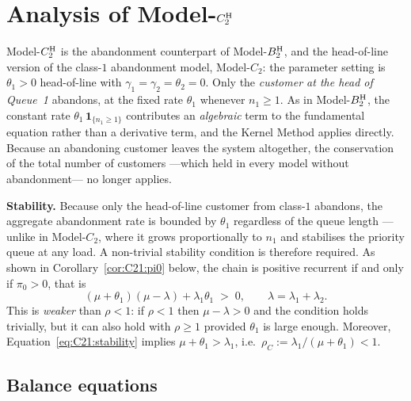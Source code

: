 \section{Analysis of Model-\texorpdfstring{$C_2^{\mathrm{H}}$}{C2-H}}
\label{sec:model_c21}



Model-$C_2^{\mathrm{H}}$ is the abandonment counterpart of Model-$B_2^{\mathrm{H}}$, and the head-of-line
version of the class-$1$ abandonment model, Model-$C_2$: the parameter setting is $\theta_1>0$ head-of-line with $\gamma_1=\gamma_2=\theta_2=0$. Only the \emph{customer at the head of Queue~1} abandons, at the fixed rate $\theta_1$ whenever $n_1\geq1$. As in Model-$B_2^{\mathrm{H}}$, the constant rate $\theta_1\,\mathbf{1}_{\{n_1\ge1\}}$ contributes an \emph{algebraic} term to the fundamental equation rather than a derivative term, and the Kernel Method applies directly. Because an abandoning customer leaves the system altogether, the conservation of the total number of customers ---which held in every model without abandonment--- no longer applies.

\textbf{Stability.} Because only the head-of-line customer from class-$1$ abandons, the aggregate abandonment rate is bounded by $\theta_1$ regardless of the queue length ---unlike in Model-$C_2$, where it grows proportionally to $n_1$ and stabilises the priority queue at any load. A non-trivial stability condition is therefore required. As shown in Corollary~\ref{cor:C21:pi0} below, the chain is positive recurrent if and only if $\pi_0>0$, that is
\begin{equation}
    (\mu+\theta_1)(\mu-\lambda) + \lambda_1\theta_1 \;>\; 0,
    \qquad \lambda=\lambda_1+\lambda_2.
    \label{eq:C21:stability}
\end{equation}
This is \emph{weaker} than $\rho<1$: if $\rho<1$ then $\mu-\lambda>0$ and the condition holds trivially, but it can also hold with $\rho\ge1$ provided $\theta_1$ is large enough. Moreover, Equation~\eqref{eq:C21:stability} implies $\mu+\theta_1>\lambda_1$, i.e.\ $\rho_C:=\lambda_1/(\mu+\theta_1)<1$.

\subsection{Balance equations}

